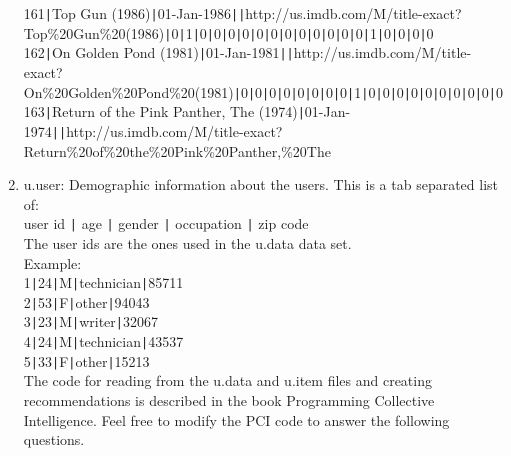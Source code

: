 \documentclass{article}
\begin{document}
\begin{enumerate}[1. ]
\scriptsize
\hspace*{-23mm}161\texttt{|}Top Gun (1986)\texttt{|}01-Jan-1986\texttt{|}\texttt{|}http://us.imdb.com/M/title-exact?Top\%20Gun\%20(1986)\texttt{|}0\texttt{|}1\texttt{|}0\texttt{|}0\texttt{|}0\texttt{|}0\texttt{|}0\texttt{|}0\texttt{|}0\texttt{|}0\texttt{|}0\texttt{|}0\texttt{|}0\texttt{|}0\texttt{|}1\texttt{|}0\texttt{|}0\texttt{|}0\texttt{|}0\\
\hspace*{-23mm}162\texttt{|}On Golden Pond (1981)\texttt{|}01-Jan-1981\texttt{|}\texttt{|}http://us.imdb.com/M/title-exact?On\%20Golden\%20Pond\%20(1981)\texttt{|}0\texttt{|}0\texttt{|}0\texttt{|}0\texttt{|}0\texttt{|}0\texttt{|}0\texttt{|}0\texttt{|}1\texttt{|}0\texttt{|}0\texttt{|}0\texttt{|}0\texttt{|}0\texttt{|}0\texttt{|}0\texttt{|}0\texttt{|}0\texttt{|}0 \\
\hspace*{-23mm}163\texttt{|}Return of the Pink Panther, The (1974)\texttt{|}01-Jan-1974\texttt{|}\texttt{|}http://us.imdb.com/M/title-exact?Return\%20of\%20the\%20Pink\%20Panther,\%20The\\

\normalsize
\item  u.user: Demographic information about the users. This is a tab
separated list of:\\

user id \texttt{|} age \texttt{|} gender \texttt{|} occupation \texttt{|} zip code\\

The user ids are the ones used in the u.data data set.\\

Example:\\

1\texttt{|}24\texttt{|}M\texttt{|}technician\texttt{|}85711 \\
2\texttt{|}53\texttt{|}F\texttt{|}other\texttt{|}94043 \\
3\texttt{|}23\texttt{|}M\texttt{|}writer\texttt{|}32067 \\
4\texttt{|}24\texttt{|}M\texttt{|}technician\texttt{|}43537 \\
5\texttt{|}33\texttt{|}F\texttt{|}other\texttt{|}15213 \\

The code for reading from the u.data and u.item files and creating recommendations is described in the book Programming Collective Intelligence.  Feel free to modify the PCI code to answer the following questions.
\end{enumerate}
\end{document}
